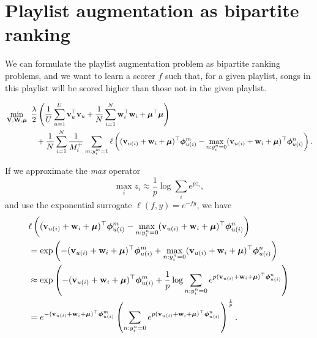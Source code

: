 \section{Playlist augmentation as bipartite ranking}

We can formulate the playlist augmentation problem as bipartite ranking problems, 
and we want to learn a scorer $f$ such that, for a given playlist, 
songs in this playlist will be scored higher than those not in the given playlist.

\begin{equation}
\label{eq:primal_pla}
\begin{aligned}
&\min_{\mathbf{V}, \mathbf{W}, \bm{\mu}} \ \frac{\lambda}{2} \left( \frac{1}{U} \sum_{u=1}^U \mathbf{v}_u^\top \mathbf{v}_u 
     + \frac{1}{N} \sum_{i=1}^N \mathbf{w}_i^\top \mathbf{w}_i + \bm{\mu}^\top \bm{\mu} \right) \\
& \hspace{4em}
     + \frac{1}{N} \sum_{i=1}^N \frac{1}{M_i^+} \sum_{m: y_i^m = 1} \ell \left( (\mathbf{v}_{u(i)} + \mathbf{w}_i + \bm{\mu})^\top \bm{\phi}_{u(i)}^m
     - \max_{n: y_i^n = 0} (\mathbf{v}_{u(i)} + \mathbf{w}_i + \bm{\mu})^\top \bm{\phi}_{u(i)}^n \right).
\end{aligned}
\end{equation}

If we approximate the \emph{max} operator
\begin{equation*}
\max_i z_i \approx \frac{1}{p} \log \sum_i e^{p z_i},
\end{equation*}
and use the exponential surrogate $\ell(f, y) = e^{-fy}$, we have
\begin{equation*}
\begin{aligned}
&\ell \left( (\mathbf{v}_{u(i)} + \mathbf{w}_i + \bm{\mu})^\top \bm{\phi}_{u(i)}^m - \max_{n: y_i^n = 0} (\mathbf{v}_{u(i)} + \mathbf{w}_i + \bm{\mu})^\top \bm{\phi}_{u(i)}^n \right) \\
&= \exp \left( -(\mathbf{v}_{u(i)} + \mathbf{w}_i + \bm{\mu})^\top \bm{\phi}_{u(i)}^m + \max_{n: y_i^n = 0} (\mathbf{v}_{u(i)} + \mathbf{w}_i + \bm{\mu})^\top \bm{\phi}_{u(i)}^n \right) \\
&\approx \exp \left( -(\mathbf{v}_{u(i)} + \mathbf{w}_i + \bm{\mu})^\top \bm{\phi}_{u(i)}^m 
            + \frac{1}{p} \log \sum_{n: y_i^n = 0} e^{p (\mathbf{v}_{u(i)} + \mathbf{w}_i + \bm{\mu})^\top \bm{\phi}_{u(i)}^n} \right) \\
&= e^{-(\mathbf{v}_{u(i)} + \mathbf{w}_i + \bm{\mu})^\top \bm{\phi}_{u(i)}^m}
   \left( \sum_{n: y_i^n = 0} e^{p (\mathbf{v}_{u(i)} + \mathbf{w}_i + \bm{\mu})^\top \bm{\phi}_{u(i)}^n} \right)^\frac{1}{p}.
\end{aligned}
\end{equation*}

